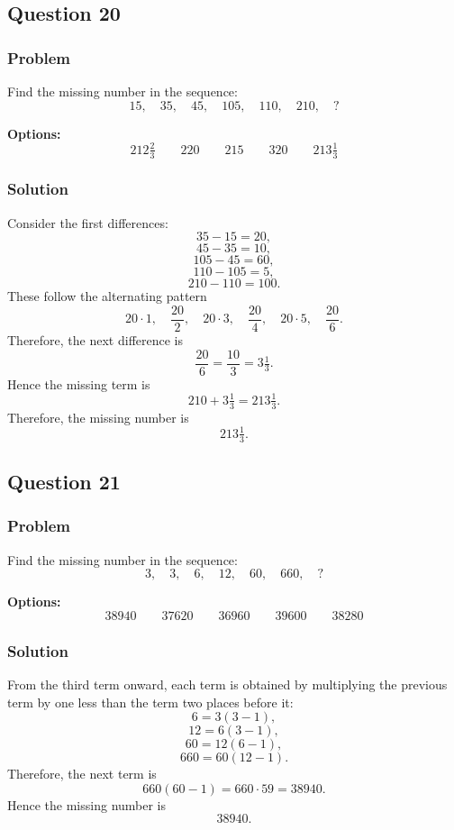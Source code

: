 \documentclass[12pt]{article}
\begin{document}
\subsection{Question 20}
\subsubsection{Problem}
Find the missing number in the sequence:
\[
15,\quad 35,\quad 45,\quad 105,\quad 110,\quad 210,\quad ?
\]

\noindent\textbf{Options:}
\[
\boxed{212\tfrac{2}{3}}
\qquad
\boxed{220}
\qquad
\boxed{215}
\qquad
\boxed{320}
\qquad
\boxed{213\tfrac{1}{3}}
\]

\subsubsection{Solution}
Consider the first differences:
\[
35-15=20,
\]
\[
45-35=10,
\]
\[
105-45=60,
\]
\[
110-105=5,
\]
\[
210-110=100.
\]
These follow the alternating pattern
\[
20\cdot 1,\quad \frac{20}{2},\quad 20\cdot 3,\quad \frac{20}{4},\quad 20\cdot 5,\quad \frac{20}{6}.
\]
Therefore, the next difference is
\[
\frac{20}{6}=\frac{10}{3}=3\tfrac{1}{3}.
\]
Hence the missing term is
\[
210+3\tfrac{1}{3}=213\tfrac{1}{3}.
\]
Therefore, the missing number is
\[
\boxed{213\tfrac{1}{3}}.
\]

\subsection{Question 21}
\subsubsection{Problem}
Find the missing number in the sequence:
\[
3,\quad 3,\quad 6,\quad 12,\quad 60,\quad 660,\quad ?
\]

\noindent\textbf{Options:}
\[
\boxed{38940}
\qquad
\boxed{37620}
\qquad
\boxed{36960}
\qquad
\boxed{39600}
\qquad
\boxed{38280}
\]

\subsubsection{Solution}
From the third term onward, each term is obtained by multiplying the previous term by one less than the term two places before it:
\[
6=3(3-1),
\]
\[
12=6(3-1),
\]
\[
60=12(6-1),
\]
\[
660=60(12-1).
\]
Therefore, the next term is
\[
660(60-1)=660\cdot 59=38940.
\]
Hence the missing number is
\[
\boxed{38940}.
\]
\end{document}
